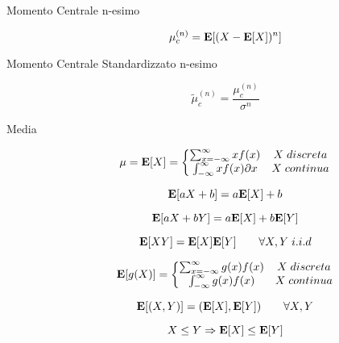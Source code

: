 \begin{description}
	\item [Momento Centrale n-esimo]	
		\begin{equation}
		\mu_{c}^{(n)}=\mathbf{E}[(X-\mathbf{E}[X])^{n}]
		\end{equation}
	
	\item [Momento Centrale Standardizzato n-esimo]	
		\begin{equation}
		\tilde{\mu}_{c}^{(n)}=\frac{\mu_{c}^{(n)}}{\sigma^{n}}
		\end{equation}
	
	\item [Media]
		\begin{equation}
		\mu=\mathbf{E}[X] = \left\{\begin{matrix}
		\sum_{x=-\infty}^{\infty} xf(x) & X \; discreta \\
		\int_{-\infty}^{\infty} x f(x) \partial x & X \; continua
		\end{matrix}\right.
		\end{equation}
	
		\begin{equation}
		\mathbf{E}[aX+b] = a\mathbf{E}[X] + b
		\end{equation}
		
		\begin{equation}
		\mathbf{E}[aX+bY] = a\mathbf{E}[X] + b\mathbf{E}[Y]
		\end{equation}
		
		\begin{equation}
		\mathbf{E}[XY] = \mathbf{E}[X] \mathbf{E}[Y] \qquad\forall X,Y \; i.i.d
		\end{equation}
		
		\begin{equation}
		\mathbf{E}[g(X)] = \left\{\begin{matrix}
		\sum_{x=-\infty}^{\infty} g(x) f(x) & X \; discreta \\
		\int_{-\infty}^{\infty} g(x) f(x) & X \; continua
		\end{matrix}\right.
		\end{equation}
		
		\begin{equation}
		\mathbf{E}[(X,Y)] = (\mathbf{E}[X],\mathbf{E}[Y]) \qquad\forall X,Y
		\end{equation}
		
		\begin{equation}
		X\leq Y \Rightarrow \mathbf{E}[X]\leq\mathbf{E}[Y]
		\end{equation}
		

\end{description}
